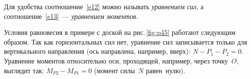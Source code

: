 \documentclass[main.tex]{subfiles}
\begin{document}
Для удобства соотношение~\eqref{e12} можно называть \emph{уравнением сил}, а соотношение~\eqref{e13}~--- \emph{уравнением моментов}.

Условия равновесия в примере с доской на рис.\,\ref{fig:p45} работают следующим образом. Так как горизонтальных сил нет, уравнение сил записывается только для вертикального направления (ось направлена, например, вверх): $N-P_1-P_2=0$. Уравнение моментов относительно оси, проходящей, например, через точку~$O$, выглядит так: $M_{P2}-M_{P1}=0$ (момент силы~$N$ равен~нулю).



 
\end{document}
